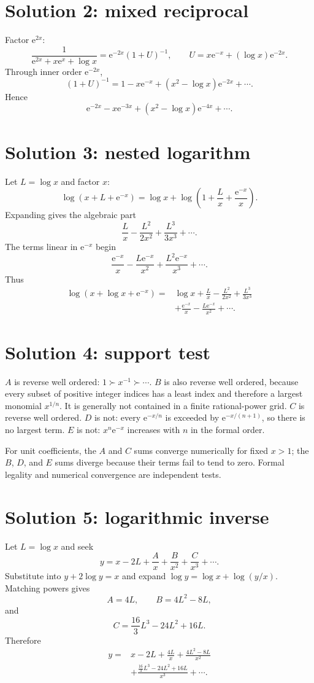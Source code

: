 \documentclass[11pt,oneside,openany]{book}
\newcommand{\e}{\mathrm{e}}
\theoremstyle{plain}
\theoremstyle{definition}
\theoremstyle{remark}
\begin{document}
\section*{Solution 2: mixed reciprocal}
Factor $\e^{2x}$:
\[
  \frac1{\e^{2x}+x\e^x+\log x}
  =\e^{-2x}(1+U)^{-1},
  \qquad U=x\e^{-x}+(\log x)\e^{-2x}.
\]
Through inner order $\e^{-2x}$,
\[
  (1+U)^{-1}=1-x\e^{-x}+(x^2-\log x)\e^{-2x}+\cdots.
\]
Hence
\[
\boxed{
  \e^{-2x}-x\e^{-3x}+(x^2-\log x)\e^{-4x}+\cdots.}
\]

\section*{Solution 3: nested logarithm}
Let $L=\log x$ and factor $x$:
\[
  \log(x+L+\e^{-x})
  =\log x+\log\left(1+\frac Lx+\frac{\e^{-x}}x\right).
\]
Expanding gives the algebraic part
\[
  \frac Lx-\frac{L^2}{2x^2}+\frac{L^3}{3x^3}+\cdots.
\]
The terms linear in $\e^{-x}$ begin
\[
  \frac{\e^{-x}}x-\frac{L\e^{-x}}{x^2}
  +\frac{L^2\e^{-x}}{x^3}+\cdots.
\]
Thus
\[
\boxed{
\begin{aligned}
\log(x+\log x+\e^{-x})
={}&\log x+\frac Lx-\frac{L^2}{2x^2}+\frac{L^3}{3x^3}\\
&+\frac{\e^{-x}}x-\frac{L\e^{-x}}{x^2}+\cdots.
\end{aligned}}
\]

\section*{Solution 4: support test}
$A$ is reverse well ordered: $1\succ x^{-1}\succ\cdots$. $B$ is also reverse well ordered, because every subset of positive integer indices has a least index and therefore a largest monomial $x^{1/n}$. It is generally not contained in a finite rational-power grid. $C$ is reverse well ordered. $D$ is not: every $\e^{-x/n}$ is exceeded by $\e^{-x/(n+1)}$, so there is no largest term. $E$ is not: $x^n\e^{-x}$ increases with $n$ in the formal order.

For unit coefficients, the $A$ and $C$ sums converge numerically for fixed $x>1$; the $B$, $D$, and $E$ sums diverge because their terms fail to tend to zero. Formal legality and numerical convergence are independent tests.

\section*{Solution 5: logarithmic inverse}
Let $L=\log x$ and seek
\[
  y=x-2L+\frac A x+\frac B{x^2}+\frac C{x^3}+\cdots.
\]
Substitute into $y+2\log y=x$ and expand $\log y=\log x+\log(y/x)$. Matching powers gives
\[
  A=4L,
  \qquad B=4L^2-8L,
\]
and
\[
  C=\frac{16}{3}L^3-24L^2+16L.
\]
Therefore
\[
\boxed{
\begin{aligned}
y={}&x-2L+\frac{4L}{x}
 +\frac{4L^2-8L}{x^2}\\
&+\frac{\frac{16}{3}L^3-24L^2+16L}{x^3}+\cdots.
\end{aligned}}
\]
\end{document}
